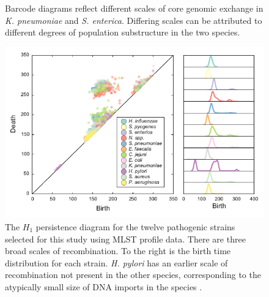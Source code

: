 \begin{figure}
    \centering
    \caption[Core genome exchange in \emph{K. pneumoniae} and \emph{S. enterica}]{Barcode diagrams reflect different scales of core genomic exchange in \emph{K. pneumoniae} and \emph{S. enterica}. Differing scales can be attributed to different degrees of population substructure in the two species.}
    \label{fig:pathogen_barcodes}
\end{figure}

\begin{figure}
\centering
\includegraphics[width=\textwidth]{./fig/pathogens/pathogen_persistence_diagram.pdf}
\caption[$H_1$ persistence diagram for twelve pathogenic strains using MLST profile data]{The $H_1$ persistence diagram for the twelve pathogenic strains selected for this study using MLST profile data. There are three broad scales of recombination. To the right is the birth time distribution for each strain. \emph{H. pylori} has an earlier scale of recombination not present in the other species, corresponding to the atypically small size of DNA imports in the species \cite{Falush:2001cd}.}
\label{fig:pathogen_persistence_diagram}
\end{figure}

